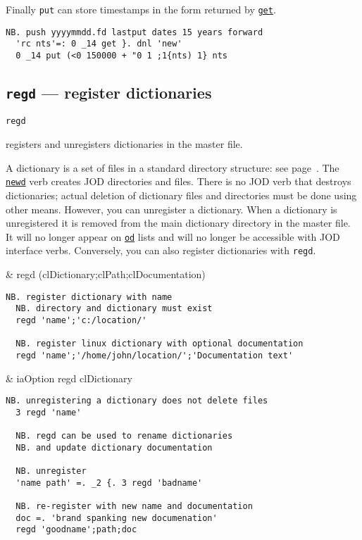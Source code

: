 Finally \texttt{put} can store timestamps in the form returned by \hyperlink{il:get}{\texttt{get}}.

\begin{lstlisting}[frame=single,framerule=0pt]  
  NB. push yyyymmdd.fd lastput dates 15 years forward
  'rc nts'=: 0 _14 get }. dnl 'new'
  0 _14 put (<0 150000 + "0 1 ;1{nts) 1} nts 
\end{lstlisting}                  


\subsection{\texttt{regd} --- register dictionaries}\label{ss:regd}

\hypertarget{il:regd}{\texttt{regd}} registers and unregisters 
 dictionaries in the master file.
 
 A dictionary is a set of files in a standard directory structure: see page~\pageref{ss:joddirs}. 
 The \hyperlink{il:newd}{\texttt{newd}} verb creates JOD directories and files.
  There is no JOD verb that destroys dictionaries; actual 
  deletion of dictionary files and directories must be done using 
  other means. However, you can unregister a dictionary. 
  When a dictionary is unregistered it is removed from the main 
  dictionary directory in the master file. It will no longer appear 
  on \hyperlink{il:od}{\texttt{od}} lists and will no longer be accessible with JOD interface verbs. 
  Conversely, you can also register dictionaries with \texttt{regd}. 

\begin{wordhead}
\monad & regd (clDictionary;clPath;clDocumentation) \\
\end{wordhead}
\begin{lstlisting}[frame=single,framerule=0pt] 
  NB. register dictionary with name 
  NB. directory and dictionary must exist
  regd 'name';'c:/location/' 

  NB. register linux dictionary with optional documentation
  regd 'name';'/home/john/location/';'Documentation text' 
\end{lstlisting} 

\begin{wordhead}
\dyad & iaOption regd clDictionary \\
\end{wordhead}
\begin{lstlisting}[frame=single,framerule=0pt] 
  NB. unregistering a dictionary does not delete files 
  3 regd 'name' 

  NB. regd can be used to rename dictionaries 
  NB. and update dictionary documentation
  
  NB. unregister
  'name path' =. _2 {. 3 regd 'badname'  
  
  NB. re-register with new name and documentation 
  doc =. 'brand spanking new documenation' 
  regd 'goodname';path;doc 
\end{lstlisting}                  


